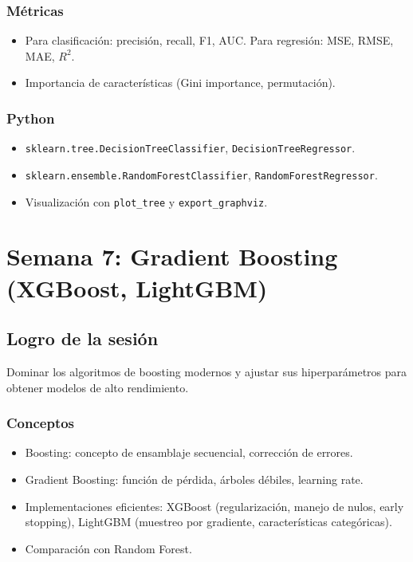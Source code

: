 \documentclass[12pt,a4paper,openany,oneside]{book}
\begin{document}
\subsection{Métricas}
\begin{itemize}
    \item Para clasificación: precisión, recall, F1, AUC. Para regresión: MSE, RMSE, MAE, \(R^2\).
    \item Importancia de características (Gini importance, permutación).
\end{itemize}

\subsection{Python}
\begin{itemize}
    \item \texttt{sklearn.tree.DecisionTreeClassifier}, \texttt{DecisionTreeRegressor}.
    \item \texttt{sklearn.ensemble.RandomForestClassifier}, \texttt{RandomForestRegressor}.
    \item Visualización con \texttt{plot\_tree} y \texttt{export\_graphviz}.
\end{itemize}

\chapter{Semana 7: Gradient Boosting (XGBoost, LightGBM)}

\section{Logro de la sesión}
Dominar los algoritmos de boosting modernos y ajustar sus hiperparámetros para obtener modelos de alto rendimiento.

\subsection{Conceptos}
\begin{itemize}
    \item Boosting: concepto de ensamblaje secuencial, corrección de errores.
    \item Gradient Boosting: función de pérdida, árboles débiles, learning rate.
    \item Implementaciones eficientes: XGBoost (regularización, manejo de nulos, early stopping), LightGBM (muestreo por gradiente, características categóricas).
    \item Comparación con Random Forest.
\end{itemize}
\end{document}
